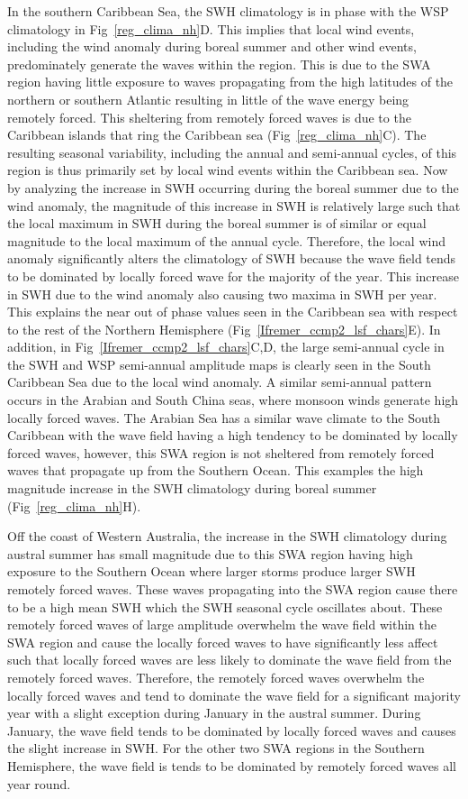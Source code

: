 \documentclass[12pt,twoside]{article}
\begin{document}
In the southern Caribbean Sea, the SWH climatology is in phase with the WSP climatology in Fig~\ref{reg_clima_nh}D. This implies that local wind events, including the wind anomaly during boreal summer and other wind events, predominately generate the waves within the region. This is due to the SWA region having little exposure to waves propagating from the high latitudes of the northern or southern Atlantic resulting in little of the wave energy being remotely forced. This sheltering from remotely forced waves is due to the Caribbean islands that ring the Caribbean sea (Fig~\ref{reg_clima_nh}C). The resulting seasonal variability, including the annual and semi-annual cycles, of this region is thus primarily set by local wind events within the Caribbean sea. Now by analyzing the increase in SWH occurring during the boreal summer due to the wind anomaly, the magnitude of this increase in SWH is relatively large such that the local maximum in SWH during the boreal summer is of similar or equal magnitude to the local maximum of the annual cycle. Therefore, the local wind anomaly significantly alters the climatology of SWH because the wave field tends to be dominated by locally forced wave for the majority of the year. This increase in SWH due to the wind anomaly also causing two maxima in SWH per year. This explains the near out of phase values seen in the Caribbean sea with respect to the rest of the Northern Hemisphere (Fig~\ref{Ifremer_ccmp2_lsf_chars}E). In addition, in Fig~\ref{Ifremer_ccmp2_lsf_chars}C,D, the large semi-annual cycle in the SWH and WSP semi-annual amplitude maps is clearly seen in the South Caribbean Sea due to the local wind anomaly. A similar semi-annual pattern occurs in the Arabian and South China seas, where monsoon winds generate high locally forced waves. The Arabian Sea has a similar wave climate to the South Caribbean with the wave field having a high tendency to be dominated by locally forced waves, however, this SWA region is not sheltered from remotely forced waves that propagate up from the Southern Ocean. This examples the high magnitude increase in the SWH climatology during boreal summer (Fig~\ref{reg_clima_nh}H). 

Off the coast of Western Australia, the increase in the SWH climatology during austral summer has small magnitude due to this SWA region having high exposure to the Southern Ocean where larger storms produce larger SWH remotely forced waves. These waves propagating into the SWA region cause there to be a high mean SWH which the SWH seasonal cycle oscillates about. These remotely forced waves of large amplitude overwhelm the wave field within the SWA region and cause the locally forced waves to have significantly less affect such that locally forced waves are less likely to dominate the wave field from the remotely forced waves. Therefore, the remotely forced waves overwhelm the locally forced waves and tend to dominate the wave field for a significant majority year with a slight exception during January in the austral summer. During January, the wave field tends to be dominated by locally forced waves and causes the slight increase in SWH. For the other two SWA regions in the Southern Hemisphere, the wave field is tends to be dominated by remotely forced waves all year round.  
\end{document}
